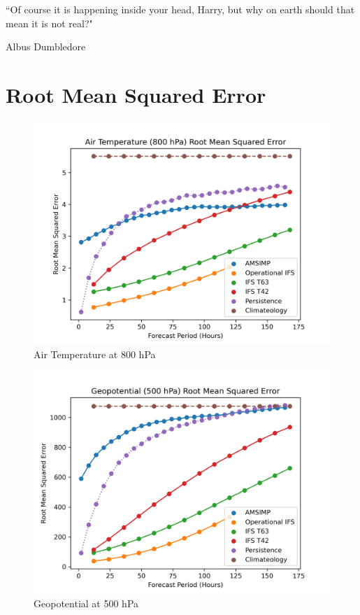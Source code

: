 \epigraph{``Of course it is happening inside your head, Harry, but why on earth should that mean it is not real?"}{Albus Dumbledore}

\section{Root Mean Squared Error}
\begin{figure}[H]
    \centering
    \includegraphics[width=.7\linewidth]{Plots/Results/Temperature/root_mean_squared_error.png}
    \caption{Air Temperature at 800 hPa}
\end{figure}

\begin{figure}[H]
    \centering
    \includegraphics[width=.7\linewidth]{Plots/Results/Geopotential/root_mean_squared_error.png}
    \caption{Geopotential at 500 hPa}
\end{figure}

